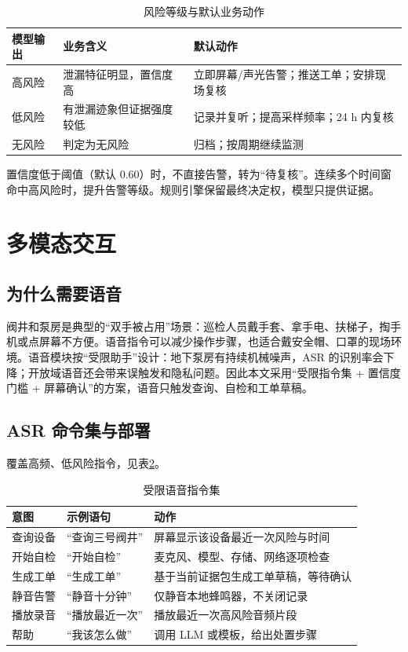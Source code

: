 \documentclass[UTF8,11pt,a4paper,fontset=none]{ctexart}
\begin{document}
\begin{table}[htbp]
\centering
\small
\caption{风险等级与默认业务动作}
\label{tab:risk}
\begin{tabular}{p{2.4cm}p{4.6cm}p{6.8cm}}
\toprule
模型输出 & 业务含义 & 默认动作 \\
\midrule
高风险 & 泄漏特征明显，置信度高 & 立即屏幕/声光告警；推送工单；安排现场复核 \\
低风险 & 有泄漏迹象但证据强度较低 & 记录并复听；提高采样频率；24 h 内复核 \\
无风险 & 判定为无风险 & 归档；按周期继续监测 \\
\bottomrule
\end{tabular}
\end{table}

置信度低于阈值（默认 0.60）时，不直接告警，转为“待复核”。连续多个时间窗命中高风险时，提升告警等级。规则引擎保留最终决定权，模型只提供证据。

\section{多模态交互}
\label{sec:multimodal}

\subsection{为什么需要语音}

阀井和泵房是典型的“双手被占用”场景：巡检人员戴手套、拿手电、扶梯子，掏手机或点屏幕不方便。语音指令可以减少操作步骤，也适合戴安全帽、口罩的现场环境。语音模块按“受限助手”设计：地下泵房有持续机械噪声，ASR 的识别率会下降；开放域语音还会带来误触发和隐私问题。因此本文采用“受限指令集 + 置信度门槛 + 屏幕确认”的方案，语音只触发查询、自检和工单草稿。

\subsection{ASR 命令集与部署}

覆盖高频、低风险指令，见表\ref{tab:asr}。

\begin{table}[H]
\centering
\small
\caption{受限语音指令集}
\label{tab:asr}
\begin{tabular}{p{2.8cm}p{5.4cm}p{6.6cm}}
\toprule
意图 & 示例语句 & 动作 \\
\midrule
查询设备 & “查询三号阀井” & 屏幕显示该设备最近一次风险与时间 \\
开始自检 & “开始自检” & 麦克风、模型、存储、网络逐项检查 \\
生成工单 & “生成工单” & 基于当前证据包生成工单草稿，等待确认 \\
静音告警 & “静音十分钟” & 仅静音本地蜂鸣器，不关闭记录 \\
播放录音 & “播放最近一次” & 播放最近一次高风险音频片段 \\
帮助 & “我该怎么做” & 调用 LLM 或模板，给出处置步骤 \\
\bottomrule
\end{tabular}
\end{table}
\end{document}
